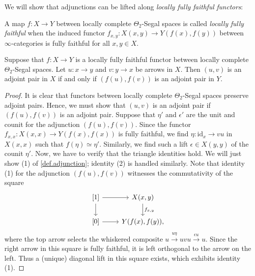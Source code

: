 \documentclass[a4paper, 11pt]{amsart}
\numberwithin{theorem}{section}
\theoremstyle{definition}
\newcommand{\id}{\mathrm{id}}
\begin{document}
We will show that adjunctions can be lifted along \textit{locally fully faithful functors}:

\begin{definition}
	A map $f : X \rightarrow Y$ between locally complete $\Theta_2$-Segal spaces is called \textit{locally fully faithful} when the
	induced functor $f_{x,y} : X(x,y) \rightarrow Y(f(x), f(y))$ between $\infty$-categories is fully faithful for all $x,y \in X$.
\end{definition}

\begin{proposition}\label{prop.lff-adjoints}
	Suppose that $f : X \rightarrow Y$ is a locally fully faithful functor between locally complete $\Theta_2$-Segal spaces. 
	Let $u : x\rightarrow y$ and $v : y\rightarrow x$ be arrows in $X$. Then $(u,v)$ is an adjoint pair in $X$ 
	if and only if $(f(u), f(v))$ is an adjoint pair in $Y$.
\end{proposition}
\begin{proof}
	It is clear that functors between locally complete $\Theta_2$-Segal spaces preserve adjoint pairs. Hence, we must show that 
	$(u,v)$ is an adjoint pair if $(f(u), f(v))$ is an adjoint pair. Suppose that $\eta'$ and $\epsilon'$ are the unit and counit 
	for the adjunction $(f(u),f(v))$. Since the functor $f_{x,x} : X(x,x) \rightarrow Y(f(x), f(x))$ is fully faithful, we find 
	$\eta : \id_x \rightarrow vu$ in $X(x,x)$ such that $f(\eta) \simeq \eta'$. Similarly, we find such a lift $\epsilon \in X(y,y)$ of the counit $\eta'$. 
	Now, we have to verify that the triangle identities hold. We will just show (1) of \cref{def.adjunction}; identity (2) is handled similarly.
	Note that identity (1) for the adjunction $(f(u), f(v))$ witnesses the commutativity of the square 
	\[
		\begin{tikzcd}
			{[1]} \arrow[r]\arrow[d] & X(x,y) \arrow[d, "{f_{x,y}}"] \\
			{[0]} \arrow[r] & Y(f(x),f(y)),
		\end{tikzcd}
	\]
	where the top arrow selects the whiskered composite $u \xrightarrow{u\eta} uvu \xrightarrow{\epsilon u} u$. Since the right arrow in this square is fully faithful, it is left orthogonal 
	to the arrow on the left. Thus a (unique) diagonal lift in this square exists, which exhibits identity (1). 
\end{proof}
\end{document}
